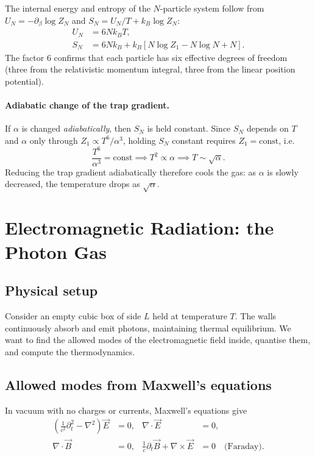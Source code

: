 The internal energy and entropy of the $N$-particle system follow from
$U_N = -\partial_\beta \log Z_N$ and $S_N = U_N/T + k_B\log Z_N$:
\begin{align}
    U_N &= 6Nk_BT,\\
    S_N &= 6Nk_B + k_B\!\left[N\log Z_1 - N\log N + N\right].
\end{align}
The factor $6$ confirms that each particle has six effective degrees of freedom
(three from the relativistic momentum integral, three from the linear position
potential).

\paragraph{Adiabatic change of the trap gradient.}  If $\alpha$ is changed
\emph{adiabatically}, then $S_N$ is held constant.  Since $S_N$ depends on $T$
and $\alpha$ only through $Z_1 \propto T^6/\alpha^3$, holding $S_N$ constant
requires $Z_1 = \text{const}$, i.e.\
\begin{equation}
    \frac{T^6}{\alpha^3} = \text{const} \implies T^2 \propto \alpha
    \implies \boxed{T \sim \sqrt{\alpha}}.
\end{equation}
Reducing the trap gradient adiabatically therefore cools the gas: as $\alpha$ is
slowly decreased, the temperature drops as $\sqrt{\alpha}$.

\section{Electromagnetic Radiation: the Photon Gas}

\subsection{Physical setup}

Consider an empty cubic box of side $L$ held at temperature $T$.  The walls
continuously absorb and emit photons, maintaining thermal equilibrium.  We want
to find the allowed modes of the electromagnetic field inside, quantise them, and
compute the thermodynamics.

\subsection{Allowed modes from Maxwell's equations}

In vacuum with no charges or currents, Maxwell's equations give
\begin{align}
    \left(\frac{1}{c^2}\partial_t^2 - \nabla^2\right)\vec{E} &= 0, &
    \nabla\cdot\vec{E} &= 0,\\
    \nabla\cdot\vec{B} &= 0, &
    \frac{1}{c}\partial_t\vec{B} + \nabla\times\vec{E} &= 0\quad\text{(Faraday)}.
\end{align}

